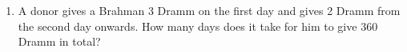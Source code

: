 \begin{enumerate}[label=\thechapter.\arabic*,ref=\thechapter.\theenumi]
\item A donor gives a Brahman 3 Dramm  on the first day and gives 2 Dramm from the second day onwards.  How many days does it take for him to give 360 Dramm in total?

\end{enumerate}
